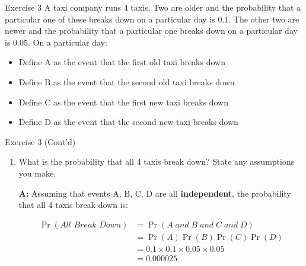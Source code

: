 \documentclass[
  ignorenonframetext,
  aspectratio=43,
]{beamer}
\let\olditem\item
\renewcommand\item{\olditem\justifying}
\begin{document}
\begin{frame}{Exercise 3}
\protect\hypertarget{exercise-3}{}
A taxi company runs 4 taxis. Two are older and the probability that a
particular one of these breaks down on a particular day is 0.1. The
other two are newer and the probability that a particular one breaks
down on a particular day is 0.05. On a particular day: \vspace{10pt}

\pause

\begin{itemize}
\item
  Define A as the event that the first old taxi breaks down
\item
  Define B as the event that the second old taxi breaks down
\item
  Define C as the event that the first new taxi breaks down
\item
  Define D as the event that the second new taxi breaks down
\end{itemize}
\end{frame}

\begin{frame}{Exercise 3 (Cont'd)}
\protect\hypertarget{exercise-3-contd}{}
\begin{enumerate}
\item
  What is the probability that all 4 taxis break down? State any
  assumptions you make.

  \pause

  \textbf{A:} Assuming that events A, B, C, D are all
  \textbf{independent}, the probability that all 4 taxis break down is:

  \[
   \begin{aligned}
   \Pr(\textit{All Break Down}) &= \Pr(A \; and \; B \; and \; C \; and \; D) \\
   & = \Pr(A)\Pr(B)\Pr(C)\Pr(D) \\
   & = 0.1 \times 0.1 \times 0.05 \times 0.05 \\
   & = 0.000025
   \end{aligned}
   \]
\end{enumerate}
\end{frame}
\end{document}
